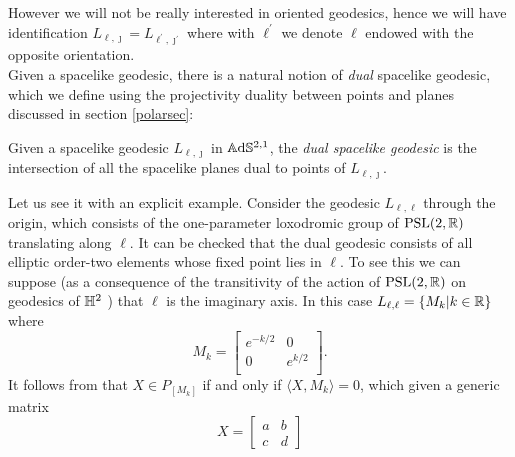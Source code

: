 However we will not be really interested in oriented geodesics, hence we will have identification $L_{\ell,\jmath}=L_{\ell^{\prime},\jmath^{\prime}}$ where with $\ell^{\prime} $ we denote $\ell$ endowed with the opposite orientation.\\
Given a spacelike geodesic, there is a natural notion of \textit{dual} spacelike geodesic, which we define using the projectivity duality between points and planes discussed in section \ref{polarsec}: 
\begin{definition}
    Given a spacelike geodesic $L_{\ell,\jmath}$ in $\mathbb{A}\mathrm{d}\mathbb{S}^{2,1}$, the \textit{dual spacelike geodesic} is the intersection of all the spacelike planes dual to points of $L_{\ell,\jmath}.$  
\end{definition}

Let us see it with an explicit example. Consider the geodesic $L_{\ell,\ell}$ through the origin, which consists of the one-parameter loxodromic group of $\text{PSL}(2,\mathbb{R})$ translating along $\ell$. It can be checked that the dual geodesic consists of all elliptic order-two elements whose fixed point lies in $\ell$. To see this we can suppose (as a consequence of the transitivity of the action of $\text{PSL}(2,\mathbb{R})$ on geodesics of $\mathbb{H}^2$ ) that $\ell$ is the imaginary axis. In this case $L_{\ell,\ell}=\{M_k|k\in\mathbb{R}\}$ where \[
    M_k=\begin{bmatrix}
        e^{-k/2} & 0 \\
        0 & e^{k/2} \\
    \end{bmatrix}.
    \]
It follows from  that $X\in P_{[M_k]}$ if and only if $\langle X, M_k\rangle=0$, which given a generic matrix
\[
    X=\begin{bmatrix}
        a & b \\

        c & d
        \end{bmatrix}
\]

